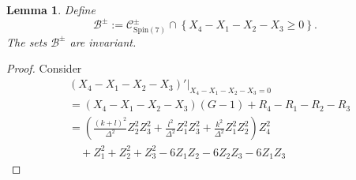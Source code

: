 \documentclass[11pt,letterpaper]{amsart}
\newtheorem{lemma}[theorem]{Lemma}
\theoremstyle{definition}
\numberwithin{equation}{section}
\newcommand{\spin}{\mathrm{Spin}}
\begin{document}
\begin{lemma}
\label{lem_B is bad}
Define 
$$\mathcal{B}^\pm:=\mathcal{C}^\pm_{\spin(7)}\cap \left\{X_4-X_1-X_2-X_3\geq 0\right\}.$$
The sets $\mathcal{B}^\pm$ are invariant.
\end{lemma}
\begin{proof}
Consider 
\begin{equation}
\label{eqn_comp B}
\begin{split}
&\left.(X_4-X_1-X_2-X_3)'\right|_{X_4-X_1-X_2-X_3=0}\\
&=(X_4-X_1-X_2-X_3)(G-1)+R_4-R_1-R_2-R_3\\
&=\left(\frac{(k+l)^2}{\Delta^2}Z_2^2Z_3^2+\frac{l^2}{\Delta^2}Z_1^2Z_3^2+\frac{k^2}{\Delta^2}Z_1^2Z_2^2\right)Z_4^2\\
&\quad +Z_1^2+Z_2^2+Z_3^2-6Z_1Z_2-6Z_2Z_3-6Z_1Z_3
\end{split}
\end{equation}


\end{proof}
\end{document}
